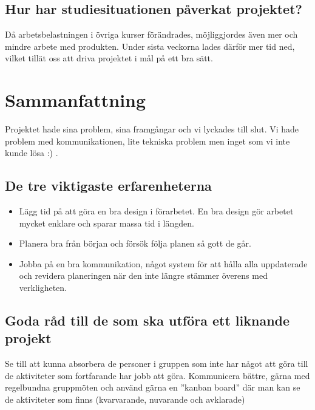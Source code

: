 \documentclass[10pt,oneside,swedish]{lips}
\begin{document}
\subsection{Hur har studiesituationen påverkat projektet?}
Då arbetsbelastningen i övriga kurser förändrades, möjliggjordes även mer och mindre arbete med produkten. Under sista veckorna lades därför mer tid ned, vilket tillät oss att driva projektet i mål på ett bra sätt.

\section{Sammanfattning}
Projektet hade sina problem, sina framgångar och vi lyckades till slut. Vi hade problem med kommunikationen, lite tekniska problem men inget som vi inte kunde lösa :) .

\subsection{De tre viktigaste erfarenheterna}

\begin{itemize}
    \item Lägg tid på att göra en bra design i förarbetet. En bra design gör arbetet mycket enklare och sparar massa tid i längden.
    \item Planera bra från början och försök följa planen så gott de går.
    \item Jobba på en bra kommunikation, något system för att hålla alla uppdaterade och revidera planeringen när den inte längre stämmer överens med verkligheten.
\end{itemize}

\subsection{Goda råd till de som ska utföra ett liknande projekt}
Se till att kunna absorbera de personer i gruppen som inte har något att göra till de aktiviteter som fortfarande har jobb att göra. Kommunicera bättre, gärna med regelbundna gruppmöten och använd gärna en ''kanban board'' där man kan se de aktiviteter som finns (kvarvarande, nuvarande och avklarade)
\end{document}
